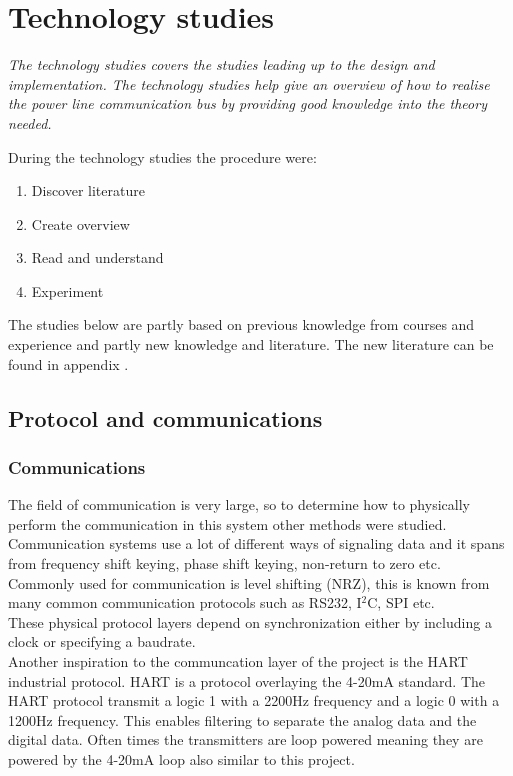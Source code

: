\chapter{Technology studies}

\textit{The technology studies covers the studies leading up to the design and implementation. The technology studies help give an overview of how to realise the power line communication bus by providing good knowledge into the theory needed.}

During the technology studies the procedure were:
\begin{enumerate}
\item Discover literature
\item Create overview
\item Read and understand
\item Experiment
\end{enumerate}
The studies below are partly based on previous knowledge from courses and experience and partly new knowledge and literature. The new literature can be found in appendix .

\section{Protocol and communications}
\subsection{Communications}
The field of communication is very large, so to determine how to physically perform the communication in this system other methods were studied.\\
Communication systems use a lot of different ways of signaling data and it spans from frequency shift keying, phase shift keying, non-return to zero etc.
Commonly used for communication is level shifting (NRZ), this is known from many common communication protocols such as RS232, I$^2$C, SPI etc.\\
These physical protocol layers depend on synchronization either by including a clock or specifying a baudrate.\\
Another inspiration to the communcation layer of the project is the HART industrial protocol. HART is a protocol overlaying the 4-20mA standard. The HART protocol transmit a logic 1 with a 2200Hz frequency and a logic 0 with a 1200Hz frequency. This enables filtering to separate the analog data and the digital data. Often times the transmitters are loop powered meaning they are powered by the 4-20mA loop also similar to this project.
